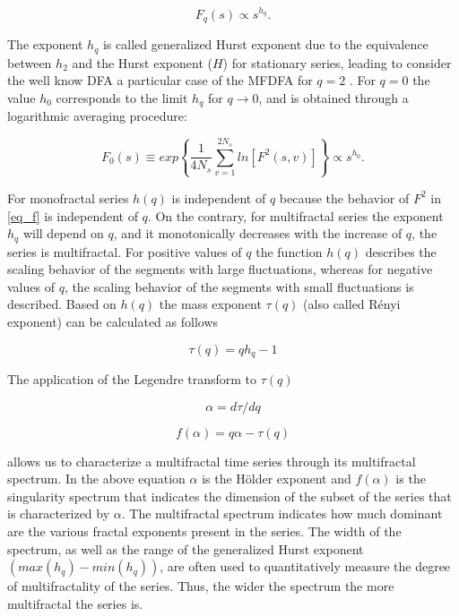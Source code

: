 \documentclass[onecolumn, preprint,aps,amsmath, amssymb, superscriptaddress]{revtex4}
\begin{document}
\begin{equation}
F_q (s) \propto s^{h_q}.
\end{equation}

The exponent $h_q$ is called generalized Hurst exponent due to the equivalence between $h_2$  and the Hurst exponent ($H$) for stationary series, leading to consider the well know DFA \cite{Peng} a particular case of the MFDFA for $q=2$ \cite{Kantelhardt_2, Zhang}. For $q=0$ the value $h_0$ corresponds to the limit $h_q$ for $q \rightarrow 0$, and is obtained through a logarithmic averaging procedure:

\begin{equation}
F_0(s) \equiv exp \left\lbrace \frac{1}{4N_s} \sum_{v=1}^{2N_s} ln[F^2 (s,v)]\right\rbrace  \propto s^{h_0}.
\end{equation}

For monofractal series $h(q)$ is independent of $q$ because the behavior of $F^2$ in \ref{eq_f} is independent of $q$. On the contrary, for multifractal series the exponent $h_q$ will depend on $q$, and it monotonically decreases with the increase of $q$, the series is multifractal. For positive values of $q$ the function $h(q)$ describes the scaling behavior of the segments with large fluctuations, whereas for negative values of $q$, the scaling behavior of the segments with small fluctuations is described. Based on $h(q)$ the mass exponent $\tau(q)$ (also called R\'enyi exponent) can be calculated as follows

\begin{equation}
\tau(q)=qh_q-1
\label{eq:Reny}
\end{equation}

The application of the Legendre transform to $\tau(q)$ 

\begin{equation}
\alpha=d\tau/dq
\end{equation}

\begin{equation}
f(\alpha)=q\alpha-\tau(q)
\end{equation}

allows us to characterize a multifractal time series through its multifractal spectrum. In the above equation $\alpha$ is the H\"older exponent and $f(\alpha)$ is the singularity spectrum that indicates the dimension of the subset of the series that is characterized by $\alpha$. The multifractal spectrum indicates how much dominant are the various fractal exponents present in the series. The width of the spectrum, as well as the range of the generalized Hurst exponent $(max(h_q)-min (h_q))$, are often used to quantitatively measure the degree of multifractality of the series. Thus, the wider the spectrum the more multifractal the series is.
\end{document}
